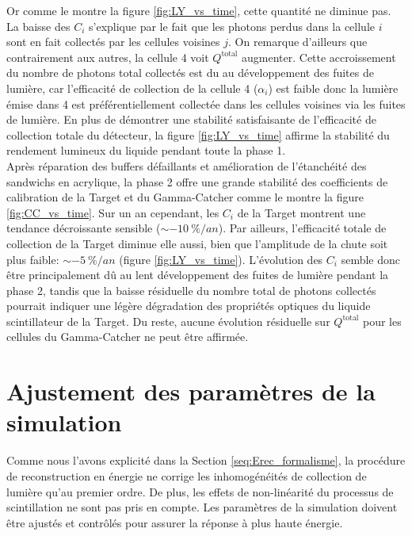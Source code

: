 Or comme le montre la figure \ref{fig:LY_vs_time}, cette quantité ne diminue pas. La baisse des $C_i$ s'explique par le fait que les photons perdus dans la cellule $i$ sont en fait collectés par les cellules voisines $j$. On remarque d'ailleurs que contrairement aux autres, la cellule 4 voit $Q^\textrm{total}$ augmenter. Cette accroissement du nombre de photons total collectés est du au développement des fuites de lumière, car l'efficacité de collection de la cellule 4 ($\alpha_i$) est faible donc la lumière émise dans 4 est préférentiellement collectée dans les cellules voisines via les fuites de lumière. En plus de démontrer une stabilité satisfaisante de l'efficacité de collection totale du détecteur, la figure \ref{fig:LY_vs_time} affirme la stabilité du rendement lumineux du liquide pendant toute la phase 1.\\

Après réparation des buffers défaillants et amélioration de l'étanchéité des sandwichs en acrylique, la phase 2 offre une grande stabilité des coefficients de calibration de la Target et du Gamma-Catcher comme le montre la figure \ref{fig:CC_vs_time}. Sur un an cependant, les $C_i$ de la Target montrent une tendance décroissante sensible ($\sim \SI{-10}{\% / an}$). Par ailleurs, l'efficacité totale de collection de la Target diminue elle aussi, bien que l'amplitude de la chute soit plus faible: $\sim \SI{-5}{\% / an}$ (figure \ref{fig:LY_vs_time}). L'évolution des $C_i$ semble donc être principalement dû au lent développement des fuites de lumière pendant la phase 2, tandis que la baisse résiduelle du nombre total de photons collectés pourrait indiquer une légère dégradation des propriétés optiques du liquide scintillateur de la Target. Du reste, aucune évolution résiduelle sur $Q^\textrm{total}$ pour les cellules du Gamma-Catcher ne peut être affirmée.\\

\bigbreak

\section{Ajustement des paramètres de la simulation}

Comme nous l'avons explicité dans la Section \ref{seq:Erec_formalisme}, la procédure de reconstruction en énergie ne corrige les inhomogénéités de collection de lumière qu'au premier ordre. De plus, les effets de non-linéarité du processus de scintillation ne sont pas pris en compte. Les paramètres de la simulation doivent être ajustés et contrôlés pour assurer la réponse à plus haute énergie.\\

